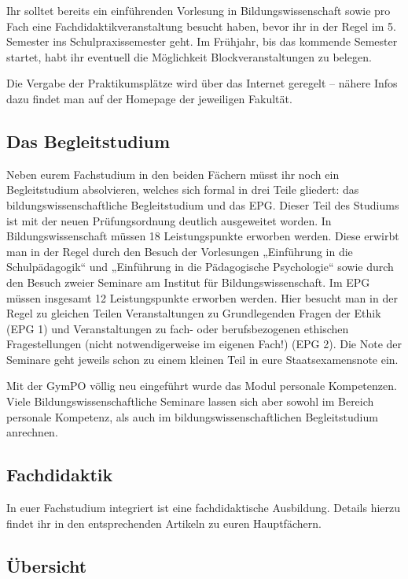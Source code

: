 Ihr solltet bereits ein einführenden Vorlesung in Bildungswissenschaft sowie pro Fach eine Fachdidaktikveranstaltung besucht haben, bevor ihr in der Regel im 5. Semester ins Schulpraxissemester geht. Im Frühjahr, bis das kommende Semester startet, habt ihr eventuell die Möglichkeit Blockveranstaltungen zu belegen.

Die Vergabe der Praktikumsplätze wird über das Internet geregelt -- nähere Infos dazu findet man auf der Homepage der jeweiligen Fakultät.

\subsection{Das Begleitstudium}
\label{epg}

Neben eurem Fachstudium in den beiden Fächern müsst ihr noch ein Begleitstudium absolvieren, welches sich formal in drei Teile gliedert: das bildungswissenschaftliche Begleitstudium und das \gls{EPG}. Dieser Teil des Studiums ist mit der neuen Prüfungsordnung deutlich ausgeweitet worden. In Bildungswissenschaft müssen 18 Leistungspunkte erworben werden. Diese erwirbt man in der Regel durch den Besuch der Vorlesungen „Einführung in die Schulpädagogik“ und „Einführung in die Pädagogische Psychologie“ sowie durch den Besuch zweier Seminare am Institut für Bildungswissenschaft. Im EPG müssen insgesamt 12 Leistungspunkte erworben werden. Hier besucht man in der Regel zu gleichen Teilen Veranstaltungen zu Grundlegenden Fragen der Ethik (\gls{EPG} 1) und Veranstaltungen zu fach- oder berufsbezogenen ethischen Fragestellungen (nicht notwendigerweise im eigenen Fach!) (\gls{EPG} 2). Die Note der Seminare geht jeweils schon zu einem kleinen Teil in eure Staatsexamensnote ein.

Mit der \gls{GymPO} völlig neu eingeführt wurde das \glqq Modul personale Kompetenzen\grqq. Viele Bildungswissenschaftliche Seminare lassen sich aber sowohl im Bereich personale Kompetenz, als auch im bildungswissenschaftlichen Begleitstudium anrechnen.

\subsection{Fachdidaktik}

In euer Fachstudium integriert ist eine fachdidaktische Ausbildung. Details hierzu findet ihr in den entsprechenden Artikeln zu euren Hauptfächern.


\subsection{Übersicht}

